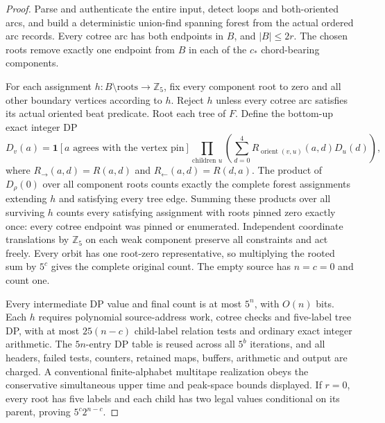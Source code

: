 \documentclass[11pt]{article}
\begin{document}
\begin{proof}
Parse and authenticate the entire input, detect loops and
both-oriented arcs, and build a deterministic union-find spanning
forest from the actual ordered arc records. Every cotree arc has both
endpoints in $B$, and $|B|\le2r$. The chosen roots remove exactly one
endpoint from $B$ in each of the $c_*$ chord-bearing components.

For each assignment $h:B\setminus\mathrm{roots}\to\mathbb Z_5$,
fix every component root to zero and all other boundary vertices
according to $h$. Reject $h$ unless every cotree arc satisfies its
actual oriented beat predicate. Root each tree of $F$. Define the
bottom-up exact integer DP
\[
D_v(a)=\mathbf1[\text{$a$ agrees with the vertex pin}]
 \prod_{\text{children }u}
 \left(\sum_{d=0}^{4}
  R_{\operatorname{orient}(v,u)}(a,d)D_u(d)\right),
\]
where $R_{\to}(a,d)=R(a,d)$ and
$R_{\leftarrow}(a,d)=R(d,a)$. The product of
$D_{\rho}(0)$ over all component roots counts exactly the complete
forest assignments extending $h$ and satisfying every tree edge.
Summing these products over all surviving $h$ counts every
satisfying assignment with roots pinned zero exactly once:
every cotree endpoint was pinned or enumerated.
Independent coordinate translations by $\mathbb Z_5$ on each
weak component preserve all constraints and act freely.
Every orbit has one root-zero representative, so multiplying the
rooted sum by $5^c$ gives the complete original count. The empty
source has $n=c=0$ and count one.

Every intermediate DP value and final count is at most $5^n$,
with $O(n)$ bits. Each $h$ requires polynomial source-address work,
cotree checks and five-label tree DP, with at most $25(n-c)$
child-label relation tests and ordinary exact integer arithmetic.
The $5n$-entry DP table is reused across all $5^b$ iterations,
and all headers, failed tests, counters, retained maps, buffers,
arithmetic and output are charged. A conventional finite-alphabet
multitape realization obeys the conservative simultaneous upper
time and peak-space bounds displayed. If $r=0$, every root has
five labels and each child has two legal values conditional on
its parent, proving $5^c2^{n-c}$.
\end{proof}
\end{document}

